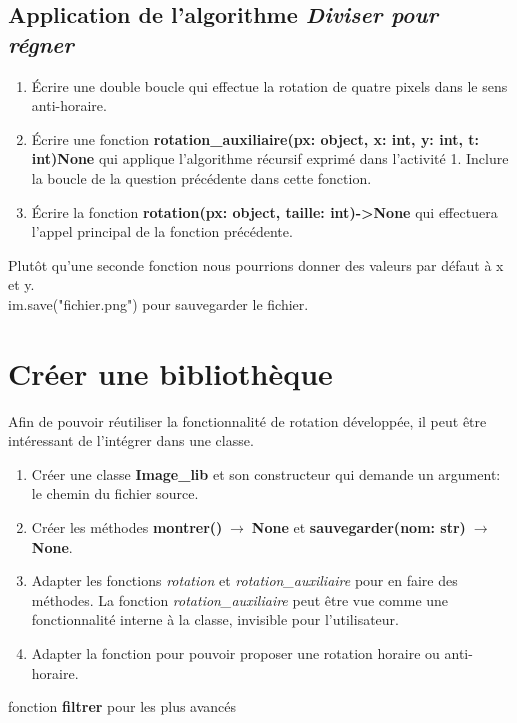 \documentclass[a4paper,11pt]{article}
\begin{document}
\begin{Form}
\subsection{Application de l'algorithme \emph{Diviser pour régner}}
\begin{activite}
\begin{enumerate}
\item Écrire une double boucle qui effectue la rotation de quatre pixels dans le sens anti-horaire.
\item Écrire une fonction \textbf{rotation\_auxiliaire(px: object, x: int, y: int, t: int)\;\rightarrow\;None} qui applique l'algorithme récursif exprimé dans l'activité 1. Inclure la boucle de la question précédente dans cette fonction.
\item Écrire la fonction \textbf{rotation(px: object, taille: int)->None} qui effectuera l'appel principal de la fonction précédente.
\end{enumerate}
\begin{commentprof}
Plutôt qu'une seconde fonction nous pourrions donner des valeurs par défaut à x et y.\\
im.save("fichier.png") pour sauvegarder le fichier.
\end{commentprof}
\end{activite}
\section{Créer une bibliothèque}
Afin de pouvoir réutiliser la fonctionnalité de rotation développée, il peut être intéressant de l'intégrer dans une classe.
\begin{activite}
\begin{enumerate}
\item Créer une classe \textbf{Image\_lib} et son constructeur qui demande un argument: le chemin du fichier source.
\item Créer les méthodes \textbf{montrer()$\;\rightarrow\;$None} et \textbf{sauvegarder(nom: str)$\;\rightarrow\;$None}.
\item Adapter les fonctions \emph{rotation} et \emph{rotation\_auxiliaire} pour en faire des méthodes. La fonction \emph{rotation\_auxiliaire} peut être vue comme une fonctionnalité interne à la classe, invisible pour l'utilisateur.
\item Adapter la fonction pour pouvoir proposer une rotation horaire ou anti-horaire.
\end{enumerate}
\begin{commentprof}
fonction \textbf{filtrer} pour les plus avancés
\end{commentprof}
\end{activite}
\end{Form}
\end{document}
